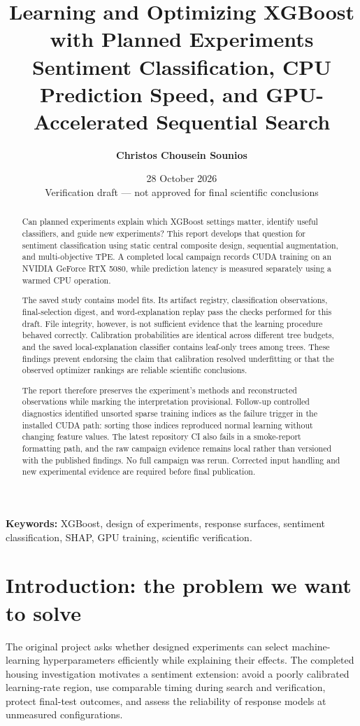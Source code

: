 \documentclass[12pt,a4paper]{article}
\title{\textbf{Learning and Optimizing XGBoost with Planned Experiments}\\[0.35em]\large Sentiment Classification, CPU Prediction Speed, and GPU-Accelerated Sequential Search}
\author{\textbf{Christos Chousein Sounios}}
\date{28 October 2026\\[0.5em]\small Verification draft --- not approved for final scientific conclusions}
\begin{document}
\maketitle
\begin{abstract}
Can planned experiments explain which XGBoost settings matter, identify useful classifiers, and guide new experiments? This report develops that question for sentiment classification using static central composite design, sequential augmentation, and multi-objective TPE. A completed local campaign records CUDA training on an NVIDIA GeForce RTX 5080, while prediction latency is measured separately using a warmed CPU operation.

The saved study contains \StudyFits{} model fits. Its artifact registry, classification observations, final-selection digest, and word-explanation replay pass the checks performed for this draft. File integrity, however, is not sufficient evidence that the learning procedure behaved correctly. Calibration probabilities are identical across different tree budgets, and the saved local-explanation classifier contains \LeafTrees{} leaf-only trees among \TreeCount{} trees. These findings prevent endorsing the claim that calibration resolved underfitting or that the observed optimizer rankings are reliable scientific conclusions.

The report therefore preserves the experiment's methods and reconstructed observations while marking the interpretation provisional. Follow-up controlled diagnostics identified unsorted sparse training indices as the failure trigger in the installed CUDA path: sorting those indices reproduced normal learning without changing feature values. The latest repository CI also fails in a smoke-report formatting path, and the raw campaign evidence remains local rather than versioned with the published findings. No full campaign was rerun. Corrected input handling and new experimental evidence are required before final publication.
\end{abstract}
\noindent\textbf{Keywords:} XGBoost, design of experiments, response surfaces, sentiment classification, SHAP, GPU training, scientific verification.
\clearpage
\setcounter{tocdepth}{2}
\begingroup\small\setlength{\parskip}{0pt}\tableofcontents\endgroup
\clearpage

\section{Introduction: the problem we want to solve}
The original project asks whether designed experiments can select machine-learning hyperparameters efficiently while explaining their effects. The completed housing investigation motivates a sentiment extension: avoid a poorly calibrated learning-rate region, use comparable timing during search and verification, protect final-test outcomes, and assess the reliability of response models at unmeasured configurations.
\end{document}
